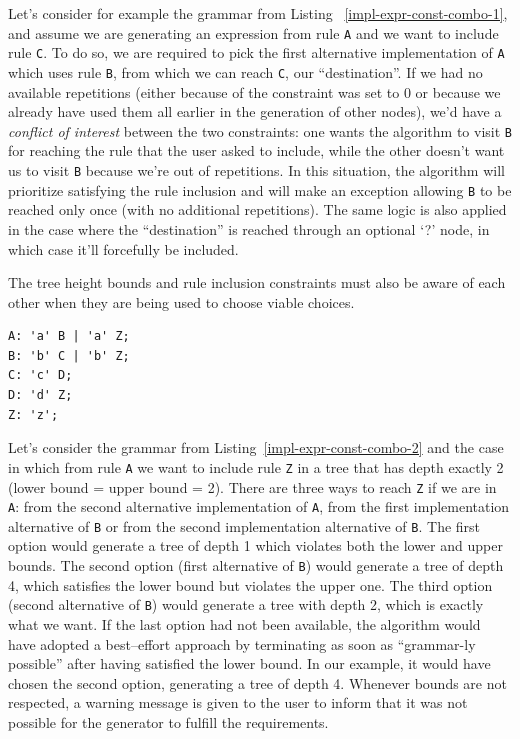 \documentclass[]{usiinfbachelorproject}
\begin{document}
Let's consider for example the grammar from Listing
~\ref{impl-expr-const-combo-1}, and assume we are generating an expression
from rule \texttt{A} and we want to include rule \texttt{C}. To do so, we are
required to pick the first alternative implementation of \texttt{A} which
uses rule \texttt{B}, from which we can reach \texttt{C}, our ``destination''.
If we had no available repetitions (either because of the constraint was
set to 0 or because we already have used them all earlier in the generation
of other nodes), we'd have a \textit{conflict of interest} between the two
constraints: one wants the algorithm to visit \texttt{B} for reaching the rule
that the user asked to include, while the other doesn't want us to visit
\texttt{B} because we're out of repetitions.
In this situation, the algorithm will prioritize satisfying the rule inclusion
and will make an exception allowing \texttt{B} to be reached only once (with no
additional repetitions).
The same logic is also applied in the case where the ``destination'' is
reached through an optional `?' node, in which case it'll forcefully be
included.

The tree height bounds and rule inclusion constraints must also be aware of
each other when they are being used to choose viable choices.

\begin{lstlisting}[caption={Fulfilling tree depth and rule inclusion
                            constraints},
                   label={impl-expr-const-combo-2},
                   style=antlr]
A: 'a' B | 'a' Z;
B: 'b' C | 'b' Z;
C: 'c' D;
D: 'd' Z;
Z: 'z';
\end{lstlisting}

Let's consider the grammar from Listing~\ref{impl-expr-const-combo-2} and the
case in which from rule \texttt{A} we want to include rule \texttt{Z} in a
tree that has depth exactly 2 (lower bound = upper bound = 2).
There are three ways to reach \texttt{Z} if we are in \texttt{A}: 
from the second alternative implementation of \texttt{A}, from the first
implementation alternative of \texttt{B} or from the second implementation
alternative of \texttt{B}.
The first option would generate a tree of depth 1 which violates both the lower
and upper bounds.
The second option (first alternative of \texttt{B}) would generate a tree of
depth 4, which satisfies the lower bound but violates the upper one.
The third option (second alternative of \texttt{B}) would generate a tree with
depth 2, which is exactly what we want.
If the last option had not been available, the algorithm would have adopted
a best–effort approach by terminating as soon as ``grammar-ly possible'' after
having satisfied the lower bound. In our example, it would have chosen the
second option, generating a tree of depth 4.
Whenever bounds are not respected, a warning message is given to the user
to inform that it was not possible for the generator to fulfill the
requirements.
\end{document}
